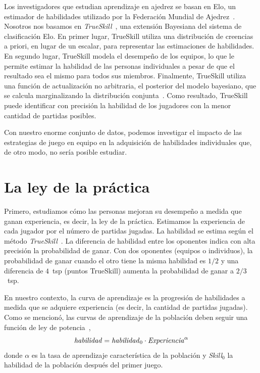 \documentclass[a4paper,11pt]{book}
\theoremstyle{definition}
\begin{document}
Los investigadores que estudian aprendizaje en ajedrez se basan en Elo, un estimador de habilidades utilizado por la Federaci\'on Mundial de Ajedrez~\cite{glickman1995-guideToChessRatings,glickman2001}.
%
Nosotros nos basamos en \emph{TrueSkill}~\cite{Herbrich2007}, una extensi\'on Bayesiana del sistema de clasificaci\'on Elo.
%
En primer lugar, TrueSkill utiliza una distribuci\'on de creencias a priori, en lugar de un escalar, para representar las estimaciones de habilidades.
%
En segundo lugar, TrueSkill modela el desempe\~no de los equipos, lo que le permite estimar la habilidad de las personas individuales a pesar de que el resultado sea el mismo para todos sus miembros.
%
Finalmente, TrueSkill utiliza una funci\'on de actualizaci\'on no arbitraria, el posterior del modelo bayesiano, que se calcula marginalizando la distribuci\'on conjunta~\cite{Kschischang2001}.
%
Como resultado, TrueSkill puede identificar con precisi\'on la habilidad de los jugadores con la menor cantidad de partidas posibles.


Con nuestro enorme conjunto de datos, podemos investigar el impacto de las estrategias de juego en equipo en la adquisici\'on de habilidades individuales que, de otro modo, no ser\'ia posible estudiar.

\section{La ley de la pr\'actica}

Primero, estudiamos c\'omo las personas mejoran su desempe\~no a medida que ganan experiencia, es decir, la ley de la pr\'actica.
%
Estimamos la experiencia de cada jugador por el n\'umero de partidas jugadas.
%
La habilidad se estima seg\'un el m\'etodo \emph{TrueSkill}~\cite{Herbrich2007}.
%
La diferencia de habilidad entre los oponentes indica con alta precisi\'on la probabilidad de ganar.
%
Con dos oponentes (equipos o individuos), la probabilidad de ganar cuando el otro tiene la misma habilidad es $1/2$ y una diferencia de $4$~tsp (puntos TrueSkill) aumenta la probabilidad de ganar a $2/3$~tsp.


En nuestro contexto, la curva de aprendizaje es la progresi\'on de habilidades a medida que se adquiere experiencia (es decir, la cantidad de partidas jugadas).
%
Como se mencion\'o, las curvas de aprendizaje de la poblaci\'on deben seguir una funci\'on de ley de potencia~\cite{Newell1981},
%
\begin{equation}\label{lawOfPractice}
   \text{\emph{habilidad}} = \text{\emph{habilidad}}_0 \cdot \text{\emph{Experiencia}}^{\alpha}
\end{equation}
%
donde $\alpha$ es la tasa de aprendizaje caracter\'istica de la poblaci\'on y \emph{Skill}$_0$ la habilidad de la poblaci\'on despu\'es del primer juego.
\end{document}
